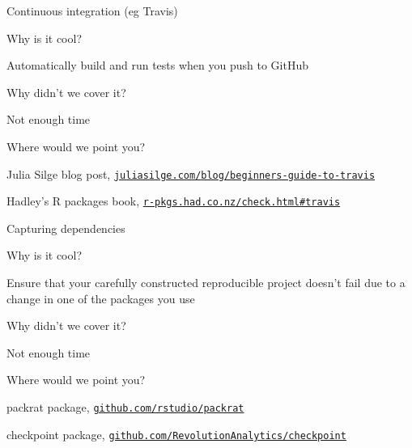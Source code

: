 \documentclass[12pt,t]{beamer}
\begin{document}
\begin{frame}[c]{Continuous integration (eg Travis)}

  \bbi
\item[] Why is it cool?
  \bi
  \item Automatically build and run tests when you push to GitHub
  \ei
\item[] Why didn't we cover it?
    \bi
    \item Not enough time
    \ei
\item[] Where would we point you?
    \bi
  \item Julia Silge blog post,
    \href{https://juliasilge.com/blog/beginners-guide-to-travis/}{\tt juliasilge.com/blog/beginners-guide-to-travis}
  \item Hadley's R packages book,
    \href{http://r-pkgs.had.co.nz/check.html\#travis}{\tt r-pkgs.had.co.nz/check.html\#travis}
   \ei
\ei


\end{frame}







\begin{frame}[c]{Capturing dependencies}

  \bbi
\item[] Why is it cool?
  \bi
  \item Ensure that your carefully constructed reproducible project
    doesn't fail due to a change in one of the packages you use
  \ei
\item[] Why didn't we cover it?
    \bi
    \item Not enough time
    \ei
\item[] Where would we point you?
    \bi
  \item packrat package, \href{https://github.com/rstudio/packrat}{\tt github.com/rstudio/packrat}
  \item checkpoint package,
    \href{https://github.com/RevolutionAnalytics/checkpoint}{\tt github.com/RevolutionAnalytics/checkpoint}
   \ei
\ei


\end{frame}
\end{document}
